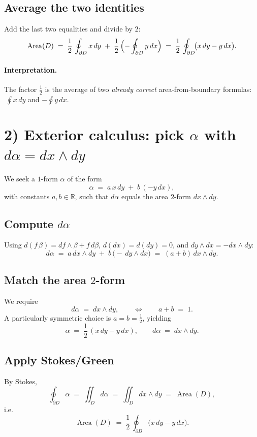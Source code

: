 \documentclass[11pt]{article}
\begin{document}
\subsection*{Average the two identities}
Add the last two equalities and divide by \(2\):
\[
\operatorname{Area}(D)
\;=\;
\frac12\,\oint_{\partial D} x\,dy
\;+\;
\frac12\,\Bigl(-\oint_{\partial D} y\,dx\Bigr)
\;=\;
\frac12\,\oint_{\partial D}\!\bigl(x\,dy - y\,dx\bigr).
\]

\paragraph{Interpretation.}
The factor \(\tfrac12\) is the average of two \emph{already correct} area-from-boundary formulas:
\(\;\displaystyle \oint x\,dy\) and \(-\displaystyle\oint y\,dx\).

\section*{2) Exterior calculus: pick \(\alpha\) with \(d\alpha=dx\wedge dy\)}

We seek a $1$-form \(\alpha\) of the form
\[
\alpha \;=\; a\,x\,dy \;+\; b\,(-y\,dx),
\]
with constants \(a,b\in\mathbb R\), such that \(d\alpha\) equals the area $2$-form \(dx\wedge dy\).

\subsection*{Compute \(d\alpha\)}
Using \(d(f\,\beta)=df\wedge\beta + f\,d\beta\), \(d(dx)=d(dy)=0\), and \(dy\wedge dx=-dx\wedge dy\):
\[
d\alpha
\;=\;
a\,dx\wedge dy
\;+\;
b\,\bigl(-\,dy\wedge dx\bigr)
\;=\;
(a+b)\,dx\wedge dy.
\]

\subsection*{Match the area $2$-form}
We require
\[
d\alpha \;=\; dx\wedge dy,
\qquad\Longleftrightarrow\qquad
a+b \;=\; 1.
\]
A particularly symmetric choice is \(a=b=\tfrac12\), yielding
\[
\alpha \;=\; \frac12\,(x\,dy - y\,dx),
\qquad
d\alpha \;=\; dx\wedge dy.
\]

\subsection*{Apply Stokes/Green}
By Stokes,
\[
\oint_{\partial D} \alpha
\;=\;
\iint_D d\alpha
\;=\;
\iint_D dx\wedge dy
\;=\;
\operatorname{Area}(D),
\]
i.e.
\[
\operatorname{Area}(D)
\;=\;
\frac12\,\oint_{\partial D}\!\bigl(x\,dy - y\,dx\bigr).
\]
\end{document}
